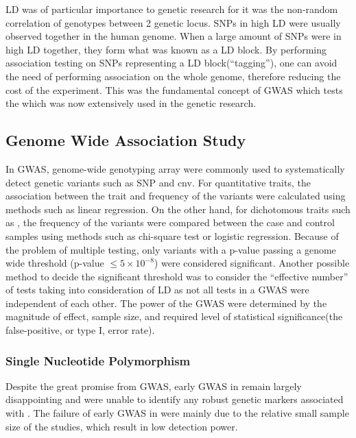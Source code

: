 	\gls{LD} was of particular importance to genetic research for it was the non-random correlation of genotypes between 2 genetic locus. 
	\glspl{SNP} in high \gls{LD} were usually observed together in the human genome.
	When a large amount of \glspl{SNP} were in high \gls{LD} together, they form what was known as a \gls{LD} block.
	By performing association testing on \glspl{SNP} representing a \gls{LD} block(``tagging''), one can avoid the need of performing association on the whole genome, therefore reducing the cost of the experiment.
	This was the fundamental concept of \gls{GWAS} which tests the 
	which was now extensively used in the genetic research.
	
	\subsection{Genome Wide Association Study}
	In \gls{GWAS}, genome-wide genotyping array were commonly used to systematically detect genetic variants such as \gls{SNP} and \gls{cnv}.
	For quantitative traits, the association between the trait and frequency of the variants were calculated using methods such as linear regression.
	On the other hand, for dichotomous traits such as , the frequency of the variants were compared between the case and control samples using methods such as chi-square test or logistic regression.
	Because of the problem of multiple testing, only variants with a p-value passing a genome wide threshold (p-value $\le5\times10^{-8}$) were considered significant.
	Another possible method to decide the significant threshold was to consider the ``effective number'' of tests\citep{Li2011} taking into consideration of \gls{LD} as not all tests in a \gls{GWAS} were independent of each other. 
	The power of the \gls{GWAS} were determined by the magnitude of effect, sample size, and required level of statistical significance(the false-positive, or type I, error rate)\citep{Purcell2003}.
	
	\subsubsection{Single Nucleotide Polymorphism} 
	Despite the great promise from \gls{GWAS}, early \gls{GWAS} in  remain largely disappointing and were unable to identify any robust genetic markers associated with .
	The failure of early \gls{GWAS} in  were mainly due to the relative small sample size of the studies, which result in low detection power.
	
